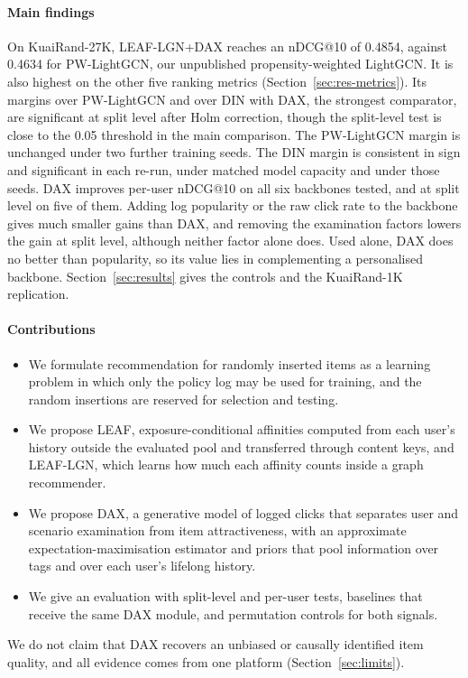 \documentclass[preprint,12pt,authoryear]{elsarticle}
\begin{document}
\paragraph{Main findings} On KuaiRand-27K, LEAF-LGN+DAX reaches an nDCG@10 of 0.4854, against 0.4634 for PW-LightGCN, our
unpublished propensity-weighted LightGCN. It is also highest on the other five ranking metrics (Section~\ref{sec:res-metrics}). Its margins over PW-LightGCN and over DIN with DAX, the strongest comparator, are
significant at split level after Holm correction, though the split-level test is close to the 0.05 threshold in the main comparison. The
PW-LightGCN margin is unchanged under two further training seeds. The DIN margin is consistent in sign and significant in each
re-run, under matched model capacity and under those seeds. DAX improves per-user nDCG@10 on all six backbones tested, and at split
level on five of them. Adding log popularity or the raw click rate to the backbone gives much smaller gains than DAX, and removing
the examination factors lowers the gain at split level, although neither factor alone does. Used alone, DAX does no better than
popularity, so its value lies in complementing a personalised backbone. Section~\ref{sec:results} gives the controls and the
KuaiRand-1K replication.

\paragraph{Contributions}
\begin{itemize}
\item We formulate recommendation for randomly inserted items as a learning problem in which only the policy log may be used for
  training, and the random insertions are reserved for selection and testing.
\item We propose LEAF, exposure-conditional affinities computed from each user's history outside the evaluated pool and transferred
  through content keys, and LEAF-LGN, which learns how much each affinity counts inside a graph recommender.
\item We propose DAX, a generative model of logged clicks that separates user and scenario examination from item attractiveness,
  with an approximate expectation-maximisation estimator and priors that pool information over tags and over each user's lifelong history.
\item We give an evaluation with split-level and per-user tests, baselines that receive the same DAX module, and permutation controls
  for both signals.
\end{itemize}
We do not claim that DAX recovers an unbiased or causally identified item quality, and all evidence comes from one platform
(Section~\ref{sec:limits}).
\end{document}
